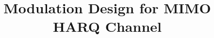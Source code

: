 \documentclass[journal,draftcls,onecolumn,12pt,twoside]{IEEEtran}
\begin{document}
%
\title{Modulation Design for MIMO HARQ Channel}
%
%
%

\author{
}

% 
%



% 
\end{document}
